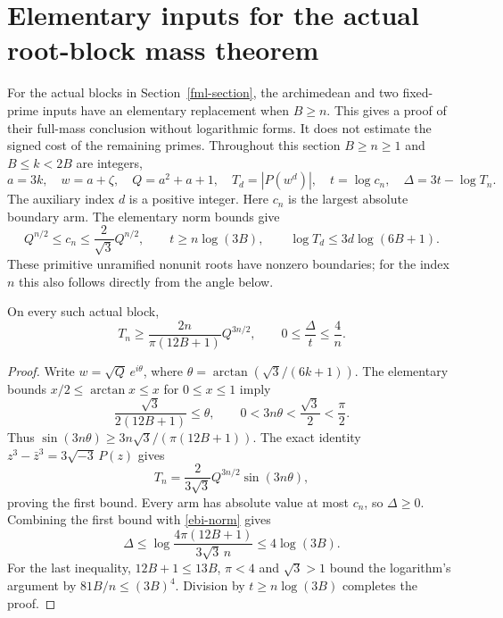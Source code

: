 \section{Elementary inputs for the actual root-block mass theorem}
\label{ebi-section}

For the actual blocks in Section~\ref{fml-section}, the archimedean
and two fixed-prime inputs have an elementary replacement when $B\ge n$.
This gives a proof of their full-mass conclusion without logarithmic
forms. It does not estimate the signed cost of the remaining primes.
Throughout this section $B\ge n\ge1$ and $B\le k<2B$ are integers,
\[
 a=3k,\quad w=a+\zeta,\quad Q=a^2+a+1,\quad
 T_d=|P(w^d)|,\quad t=\log c_n,\quad \Delta=3t-\log T_n.
\]
The auxiliary index $d$ is a positive integer. Here $c_n$ is the largest absolute boundary arm. The elementary norm
bounds give
\begin{equation}\label{ebi-norm}
 Q^{n/2}\le c_n\le\frac2{\sqrt3}Q^{n/2},\qquad
 t\ge n\log(3B),\qquad \log T_d\le3d\log(6B+1).
\end{equation}
These primitive unramified nonunit roots have nonzero boundaries;
for the index $n$ this also follows directly from the angle below.

\begin{lemma}\label{ebi-angle}
On every such actual block,
\begin{equation}\label{ebi-angular-bound}
 T_n\ge\frac{2n}{\pi(12B+1)}Q^{3n/2},\qquad
 0\le\frac\Delta t\le\frac4n.
\end{equation}
\end{lemma}
\begin{proof}
Write $w=\sqrt Q\,e^{i\theta}$, where
$\theta=\arctan(\sqrt3/(6k+1))$. The elementary bounds
$x/2\le\arctan x\le x$ for $0\le x\le1$ imply
\[
 \frac{\sqrt3}{2(12B+1)}\le\theta,\qquad
 0<3n\theta<\frac{\sqrt3}{2}<\frac\pi2.
\]
Thus $\sin(3n\theta)\ge3n\sqrt3/(\pi(12B+1))$.
The exact identity
$z^3-\bar z^3=3\sqrt{-3}\,P(z)$ gives
\[
 T_n=\frac2{3\sqrt3}Q^{3n/2}\sin(3n\theta),
\]
proving the first bound. Every arm has absolute value at most $c_n$,
so $\Delta\ge0$. Combining the first bound with
\eqref{ebi-norm} gives
\[
 \Delta\le\log\frac{4\pi(12B+1)}{3\sqrt3\,n}
          \le4\log(3B).
\]
For the last inequality, $12B+1\le13B$, $\pi<4$ and $\sqrt3>1$
bound the logarithm's argument by $81B/n\le(3B)^4$.
Division by $t\ge n\log(3B)$ completes the proof.
\end{proof}

